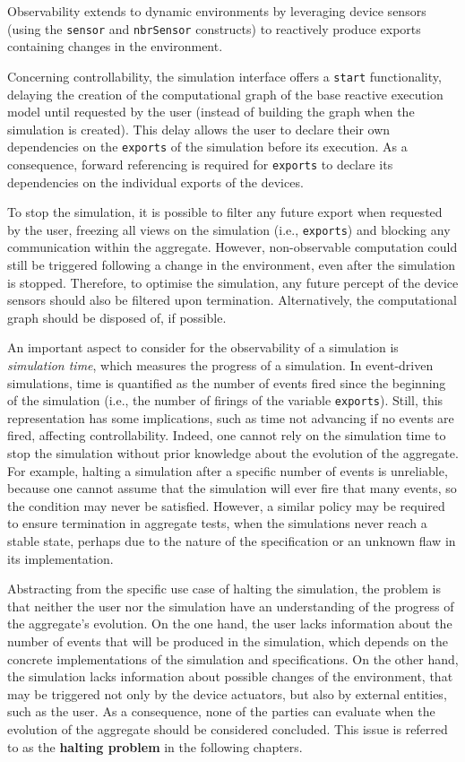 Observability extends to dynamic environments by leveraging device sensors
(using the \texttt{sensor} and \texttt{nbrSensor} constructs) to reactively
produce exports containing changes in the environment.

Concerning controllability, the simulation interface offers a \texttt{start}
functionality, delaying the creation of the computational graph of the base
reactive execution model until requested by the user (instead of building the
graph when the simulation is created). This delay allows the user to declare
their own dependencies on the \texttt{exports} of the simulation before its
execution. As a consequence, forward referencing is required for
\texttt{exports} to declare its dependencies on the individual exports of the
devices.

To stop the simulation, it is possible to filter any future export when
requested by the user, freezing all views on the simulation (i.e.,
\texttt{exports}) and blocking any communication within the aggregate. However,
non-observable computation could still be triggered following a change in the
environment, even after the simulation is stopped. Therefore, to optimise the
simulation, any future percept of the device sensors should also be filtered
upon termination. Alternatively, the computational graph should be disposed of,
if possible.

An important aspect to consider for the observability of a simulation is
\textit{simulation time}, which measures the progress of a simulation. In
event-driven simulations, time is quantified as the number of events fired
since the beginning of the simulation (i.e., the number of firings of the
variable \texttt{exports}). Still, this representation has some implications,
such as time not advancing if no events are fired, affecting controllability.
Indeed, one cannot rely on the simulation time to stop the simulation without
prior knowledge about the evolution of the aggregate. For example, halting a
simulation after a specific number of events is unreliable, because one cannot
assume that the simulation will ever fire that many events, so the condition
may never be satisfied. However, a similar policy may be required to ensure
termination in aggregate tests, when the simulations never reach a stable
state, perhaps due to the nature of the specification or an unknown flaw in its
implementation.

Abstracting from the specific use case of halting the simulation, the problem
is that neither the user nor the simulation have an understanding of the
progress of the aggregate's evolution. On the one hand, the user lacks
information about the number of events that will be produced in the simulation,
which depends on the concrete implementations of the simulation and
specifications. On the other hand, the simulation lacks information about
possible changes of the environment, that may be triggered not only by the
device actuators, but also by external entities, such as the user. As a
consequence, none of the parties can evaluate when the evolution of the
aggregate should be considered concluded. This issue is referred to as the
\textbf{halting problem} in the following chapters.
